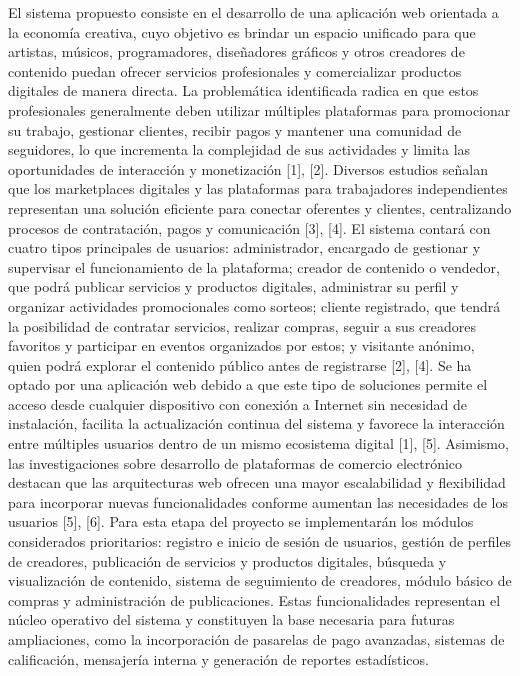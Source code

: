 \documentclass[
]{article}
\begin{document}
El sistema propuesto consiste en el desarrollo de una aplicación web
orientada a la economía creativa, cuyo objetivo es brindar un espacio
unificado para que artistas, músicos, programadores, diseñadores
gráficos y otros creadores de contenido puedan ofrecer servicios
profesionales y comercializar productos digitales de manera directa. La
problemática identificada radica en que estos profesionales generalmente
deben utilizar múltiples plataformas para promocionar su trabajo,
gestionar clientes, recibir pagos y mantener una comunidad de
seguidores, lo que incrementa la complejidad de sus actividades y limita
las oportunidades de interacción y monetización {[}1{]}, {[}2{]}.
Diversos estudios señalan que los marketplaces digitales y las
plataformas para trabajadores independientes representan una solución
eficiente para conectar oferentes y clientes, centralizando procesos de
contratación, pagos y comunicación {[}3{]}, {[}4{]}. El sistema contará
con cuatro tipos principales de usuarios: administrador, encargado de
gestionar y supervisar el funcionamiento de la plataforma; creador de
contenido o vendedor, que podrá publicar servicios y productos
digitales, administrar su perfil y organizar actividades promocionales
como sorteos; cliente registrado, que tendrá la posibilidad de contratar
servicios, realizar compras, seguir a sus creadores favoritos y
participar en eventos organizados por estos; y visitante anónimo, quien
podrá explorar el contenido público antes de registrarse {[}2{]},
{[}4{]}. Se ha optado por una aplicación web debido a que este tipo de
soluciones permite el acceso desde cualquier dispositivo con conexión a
Internet sin necesidad de instalación, facilita la actualización
continua del sistema y favorece la interacción entre múltiples usuarios
dentro de un mismo ecosistema digital {[}1{]}, {[}5{]}. Asimismo, las
investigaciones sobre desarrollo de plataformas de comercio electrónico
destacan que las arquitecturas web ofrecen una mayor escalabilidad y
flexibilidad para incorporar nuevas funcionalidades conforme aumentan
las necesidades de los usuarios {[}5{]}, {[}6{]}. Para esta etapa del
proyecto se implementarán los módulos considerados prioritarios:
registro e inicio de sesión de usuarios, gestión de perfiles de
creadores, publicación de servicios y productos digitales, búsqueda y
visualización de contenido, sistema de seguimiento de creadores, módulo
básico de compras y administración de publicaciones. Estas
funcionalidades representan el núcleo operativo del sistema y
constituyen la base necesaria para futuras ampliaciones, como la
incorporación de pasarelas de pago avanzadas, sistemas de calificación,
mensajería interna y generación de reportes estadísticos.
\end{document}
